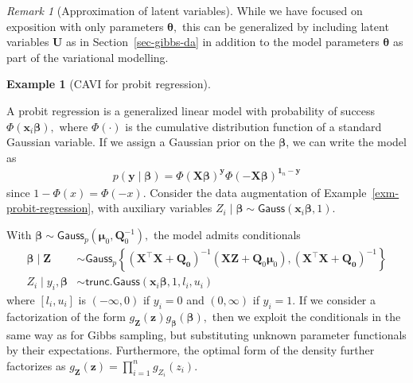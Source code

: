 \documentclass[
  11pt,
  letterpaper,
]{scrbook}
\theoremstyle{plain}
\theoremstyle{plain}
\theoremstyle{definition}
\theoremstyle{definition}
\theoremstyle{definition}
\newtheorem{example}{Example}[chapter]
\theoremstyle{plain}
\theoremstyle{remark}
\newtheorem{refremark}{Remark}[chapter]
\begin{document}
\begin{refremark}[Approximation of latent variables]
While we have focused on exposition with only parameters
\(\boldsymbol{\theta},\) this can be generalized by including latent
variables \(\boldsymbol{U}\) as in Section~\ref{sec-gibbs-da} in
addition to the model parameters \(\boldsymbol{\theta}\) as part of the
variational modelling.

\label{rem-approximation-latent}

\end{refremark}

\begin{example}[CAVI for probit
regression]\protect\hypertarget{exm-probit-reg-cavi}{}\label{exm-probit-reg-cavi}

A probit regression is a generalized linear model with probability of
success \(\Phi(\mathbf{x}_i\boldsymbol{\beta}),\) where \(\Phi(\cdot)\)
is the cumulative distribution function of a standard Gaussian variable.
If we assign a Gaussian prior on the \(\boldsymbol{\beta}\), we can
write the model as \begin{align*}
p(\boldsymbol{y} \mid \boldsymbol{\beta}) = \Phi(\mathbf{X}\boldsymbol{\beta})^{\boldsymbol{y}}\Phi(-\mathbf{X}\boldsymbol{\beta})^{\boldsymbol{1}_n -\boldsymbol{y}}
\end{align*} since \(1-\Phi(x) = \Phi(-x).\) Consider the data
augmentation of Example~\ref{exm-probit-regression}, with auxiliary
variables
\(Z_i \mid \boldsymbol{\beta}\sim \mathsf{Gauss}(\mathbf{x}_i\boldsymbol{\beta}, 1).\)

With
\(\boldsymbol{\beta} \sim \mathsf{Gauss}_p(\boldsymbol{\mu}_0, \mathbf{Q}_0^{-1}),\)
the model admits conditionals \begin{align*}
\boldsymbol{\beta} \mid \boldsymbol{Z} &\sim \mathsf{Gauss}_p\left\{(\mathbf{X}^\top\mathbf{X} + \mathbf{Q_0})^{-1}(\mathbf{X}\boldsymbol{Z} + \mathbf{Q}_0\boldsymbol{\mu}_0),  (\mathbf{X}^\top\mathbf{X} + \mathbf{Q_0})^{-1} \right\}
\\
Z_i \mid y_i, \boldsymbol{\beta} &\sim \mathsf{trunc. Gauss}(\mathbf{x}_i\boldsymbol{\beta}, 1, l_i, u_i) 
\end{align*} where \([l_i, u_i]\) is \((-\infty,0)\) if \(y_i=0\) and
\((0, \infty)\) if \(y_i=1.\) If we consider a factorization of the form
\(g_{\boldsymbol{Z}}(\boldsymbol{z})g_{\boldsymbol{\beta}}(\boldsymbol{\beta}),\)
then we exploit the conditionals in the same way as for Gibbs sampling,
but substituting unknown parameter functionals by their expectations.
Furthermore, the optimal form of the density further factorizes as
\(g_{\boldsymbol{Z}}(\boldsymbol{z}) = \prod_{i=1}^n g_{Z_i}(z_i).\)


\end{example}
\end{document}
